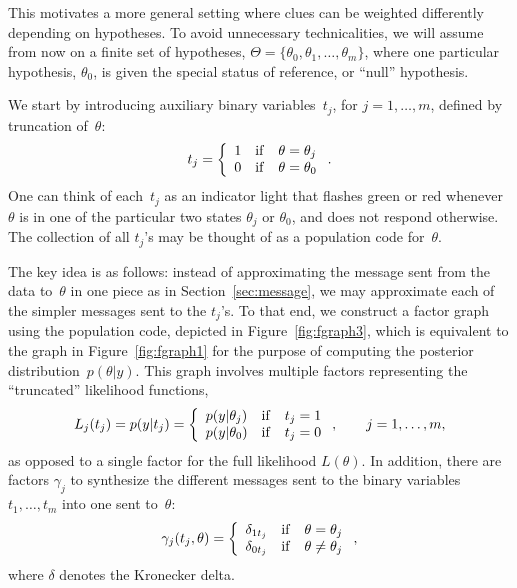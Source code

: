 \documentclass[english]{scrartcl}
\begin{document}
This motivates a more general setting where clues can be weighted differently depending on hypotheses. To avoid unnecessary technicalities, we will assume from now on a finite set of hypotheses, $\Theta=\{\theta_0,\theta_1,\ldots,\theta_m\}$, where one particular hypothesis, $\theta_0$, is given the special status of reference, or ``null'' hypothesis. 

We start by introducing auxiliary binary variables~$t_j$, for $j=1,\ldots,m$, defined by truncation of~$\theta$:
\begin{equation}
\label{eq:binary}
t_j = 
\left\{
\begin{array}{lll}
1 & {\rm if} & \theta = \theta_j \\
0 & {\rm if} & \theta = \theta_0
\end{array}
\right.
.
\end{equation}
One can think of each~$t_j$ as an indicator light that flashes green or red whenever~$\theta$ is in one of the particular two states $\theta_j$ or $\theta_0$, and does not respond otherwise. The collection of all $t_j$'s may be thought of as a population code \cite{Knill-04} for~$\theta$. 

The key idea is as follows: instead of approximating the message sent from the data to~$\theta$ in one piece as in Section~\ref{sec:message}, we may approximate each of the simpler messages sent to the $t_j$'s. To that end, we construct a factor graph using the population code, depicted in Figure~\ref{fig:fgraph3}, which is equivalent to the graph in Figure~\ref{fig:fgraph1} for the purpose of computing the posterior distribution~$p(\theta|y)$. This graph involves multiple factors representing the ``truncated'' likelihood functions, 
$$
L_j(t_j)=p(y|t_j)=
\left\{
\begin{array}{lll}
p(y|\theta_j) & {\rm if} & t_j=1 \\
p(y|\theta_0) & {\rm if} & t_j=0
\end{array}
\right.
,
\qquad j=1,\ldots,m,
$$
as opposed to a single factor for the full likelihood $L(\theta)$. In addition, there are factors $\gamma_j$ to synthesize the different messages sent to the binary variables $t_1,\ldots,t_m$ into one sent to~$\theta$:
\begin{equation}
\label{eq:factor_gamma}
\gamma_j(t_j,\theta)
= 
\left\{
\begin{array}{lll}
\delta_{1t_{j}} & {\rm if} & \theta=\theta_j \\
\delta_{0t_{j}} & {\rm if} & \theta\not=\theta_j
\end{array}
\right.
,
\end{equation}
where $\delta$ denotes the Kronecker delta. 
\end{document}

